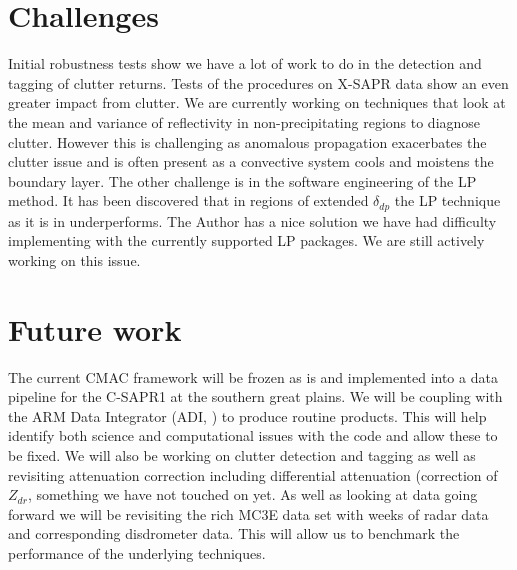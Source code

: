 \documentclass[twocol]{ametsoc}
\begin{document}

\section{Challenges}
Initial robustness tests show we have a lot of work to do in the detection and tagging of clutter returns. Tests of the procedures on X-SAPR data show an even greater impact from clutter. We are currently working on techniques that look at the mean and variance of reflectivity in non-precipitating regions to diagnose clutter. However this is challenging as anomalous propagation exacerbates the clutter issue and is often present as a convective system cools and moistens the boundary layer.  
The other challenge is in the software engineering of the LP method. It has been discovered that in regions of extended $\delta_{dp}$ the LP technique as it is in \cite{gian_2008} underperforms. The Author has a nice solution we have had difficulty implementing with the currently supported LP packages. We are still actively working on this issue. 

\section{Future work}
The current CMAC framework will be frozen as is and implemented into a data pipeline for the C-SAPR1 at the southern great plains. We will be coupling with the ARM Data Integrator (ADI, \cite{ADI}) to produce routine products. This will help identify both science and computational issues with the code and allow these to be fixed. We will also be working on clutter detection and tagging as well as revisiting attenuation correction including differential attenuation (correction of $Z_{dr}$, something we have not touched on yet. As well as looking at data going forward we will be revisiting the rich MC3E data set with weeks of radar data and corresponding disdrometer data. This will allow us to benchmark the performance of the underlying techniques. 
\end{document}
